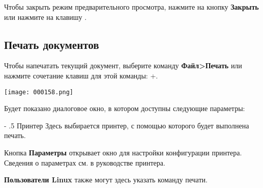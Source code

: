 ﻿\documentclass[a4paper,10pt]{article}
\makeatletter
\renewcommand\paragraph{%
   \@startsection{paragraph}{4}{0mm}%
      {-\baselineskip}%
      {.5\baselineskip}%
      {\normalfont\normalsize\bfseries}}
\makeatother
\begin{document}
Чтобы закрыть режим предварительного просмотра, нажмите на кнопку \textbf{Закрыть} или нажмите на клавишу .

\subsection{Печать документов}
Чтобы напечатать текущий документ, выберите команду \textbf{Файл>Печать} или нажмите сочетание клавиш для этой команды: +.

\texttt{[image: 000158.png]}

Будет показано диалоговое окно, в котором доступны следующие параметры:

\paragraph{Принтер}
Здесь выбирается принтер, с помощью которого будет выполнена печать.

Кнопка \textbf{Параметры} открывает окно для настройки конфигурации принтера. Сведения о параметрах см. в руководстве принтера.

\textbf{Пользователи Linux} также могут здесь указать команду печати.
\end{document}
